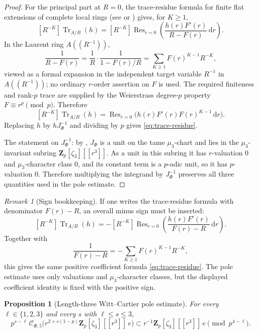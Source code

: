 \documentclass[11pt]{amsart}
\newtheorem{proposition}[theorem]{Proposition}
\theoremstyle{definition}
\theoremstyle{remark}
\newtheorem{remark}[theorem]{Remark}
\newcommand{\Z}{\mathbf{Z}}
\newcommand{\dd}{\mathrm{d}}
\newcommand{\Res}{\operatorname{Res}}
\newcommand{\Tr}{\operatorname{Tr}}
\begin{document}
\begin{proof}
For the principal part at $R=0$, the trace-residue formula for finite flat extensions of complete local rings (see \cite[\S 3]{Tate-residues} or \cite[Ch.~III]{Hartshorne-RD}) gives, for $K\ge 1$,
\[
[R^{-K}]\Tr_{A/B}(h)=[R^{-K}]\Res_{r=0}\!\left(\frac{h(r)F'(r)}{R-F(r)}\,\dd r\right).
\]
In the Laurent ring $A((R^{-1}))$,
\[
\frac{1}{R-F(r)}=\frac{1}{R}\cdot\frac{1}{1-F(r)/R}=\sum_{K\ge 1}F(r)^{K-1}R^{-K},
\]
viewed as a formal expansion in the independent target variable $R^{-1}$ in $A((R^{-1}))$; no ordinary $r$-order assertion on $F$ is used. The required finiteness and rank-$p$ trace are supplied by the Weierstrass degree-$p$ property $F\equiv r^p\pmod p$. Therefore
\[
[R^{-K}]\Tr_{A/B}(h)=\Res_{r=0}\!\bigl(h(r)F'(r)F(r)^{K-1}\,\dd r\bigr).
\]
Replacing $h$ by $hJ_\Phi^{-1}$ and dividing by $p$ gives \eqref{eq:trace-residue}.

The statement on $J_\Phi^{-1}$: by , $J_\Phi$ is a unit on the tame $\mu_3$-chart and lies in the $\mu_3$-invariant subring $\Z_p[\zeta_3][[r^3]]$. As a unit in this subring it has $r$-valuation $0$ and $\mu_3$-character class $0$, and its constant term is a $p$-adic unit, so it has $p$-valuation $0$. Therefore multiplying the integrand by $J_\Phi^{-1}$ preserves all three quantities used in the pole estimate.
\end{proof}

\begin{remark}[Sign bookkeeping]\label{rem:trace-residue-sign}
If one writes the trace-residue formula with denominator $F(r)-R$, an overall minus sign must be inserted:
\[
[R^{-K}]\Tr_{A/B}(h)=-[R^{-K}]\Res_{r=0}\!\left(\frac{h(r)F'(r)}{F(r)-R}\,\dd r\right).
\]
Together with
\[
\frac{1}{F(r)-R}=-\sum_{K\ge 1}F(r)^{K-1}R^{-K},
\]
this gives the same positive coefficient formula \eqref{eq:trace-residue}. The pole estimate uses only valuations and $\mu_3$-character classes, but the displayed coefficient identity is fixed with the positive sign.
\end{remark}

\begin{proposition}[Length-three Witt--Cartier pole estimate]\label{prop:pole-estimate}\label{prop:pole-estimate-star}
For every $\ell\in\{1,2,3\}$ and every $s$ with $\ell\le s\le 3$,
\begin{equation}\label{eq:star}
p^{s-\ell}\,\mathcal C_{\Phi,5}\!\bigl(r^{2+s(1-p)}\Z_p[\zeta_3][[r^3]]\,e\bigr)\subset r^{-1}\Z_p[\zeta_3][[r^3]]\,e\pmod{p^{4-\ell}}.
\end{equation}
\end{proposition}
\end{document}
